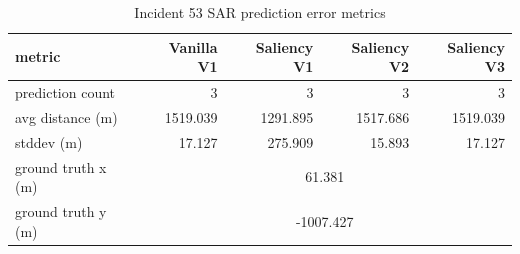 \begin{table}[ht]
\centering
\caption{Incident 53 SAR prediction error metrics}
\label{tab:sar-incident-53}
\begin{tabular}{lrrrr}
\hline
metric & Vanilla V1 & Saliency V1 & Saliency V2 & Saliency V3 \\
\hline
prediction count & 3 & 3 & 3 & 3 \\
avg distance (m) & 1519.039 & 1291.895 & 1517.686 & 1519.039 \\
stddev (m) & 17.127 & 275.909 & 15.893 & 17.127 \\
ground truth x (m) & \multicolumn{4}{c}{61.381} \\
ground truth y (m) & \multicolumn{4}{c}{-1007.427} \\
\hline
\end{tabular}
\end{table}
